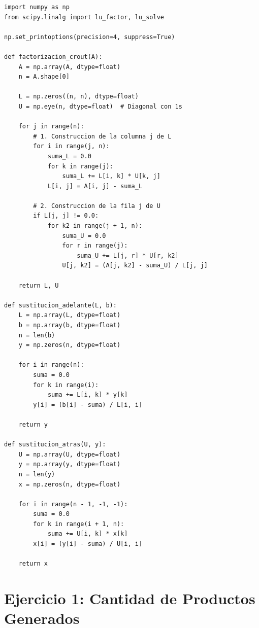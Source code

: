 \documentclass[11pt,a4paper]{article}
\begin{document}
\begin{lstlisting}
import numpy as np
from scipy.linalg import lu_factor, lu_solve

np.set_printoptions(precision=4, suppress=True)

def factorizacion_crout(A):
    A = np.array(A, dtype=float)
    n = A.shape[0]
    
    L = np.zeros((n, n), dtype=float)
    U = np.eye(n, dtype=float)  # Diagonal con 1s
    
    for j in range(n):
        # 1. Construccion de la columna j de L
        for i in range(j, n):
            suma_L = 0.0
            for k in range(j):
                suma_L += L[i, k] * U[k, j]
            L[i, j] = A[i, j] - suma_L
        
        # 2. Construccion de la fila j de U
        if L[j, j] != 0.0:
            for k2 in range(j + 1, n):
                suma_U = 0.0
                for r in range(j):
                    suma_U += L[j, r] * U[r, k2]
                U[j, k2] = (A[j, k2] - suma_U) / L[j, j]
            
    return L, U

def sustitucion_adelante(L, b):
    L = np.array(L, dtype=float)
    b = np.array(b, dtype=float)
    n = len(b)
    y = np.zeros(n, dtype=float)
    
    for i in range(n):
        suma = 0.0
        for k in range(i):
            suma += L[i, k] * y[k]
        y[i] = (b[i] - suma) / L[i, i]
        
    return y

def sustitucion_atras(U, y):
    U = np.array(U, dtype=float)
    y = np.array(y, dtype=float)
    n = len(y)
    x = np.zeros(n, dtype=float)
    
    for i in range(n - 1, -1, -1):
        suma = 0.0
        for k in range(i + 1, n):
            suma += U[i, k] * x[k]
        x[i] = (y[i] - suma) / U[i, i]
        
    return x
\end{lstlisting}

\section{Ejercicio 1: Cantidad de Productos Generados}
\end{document}
